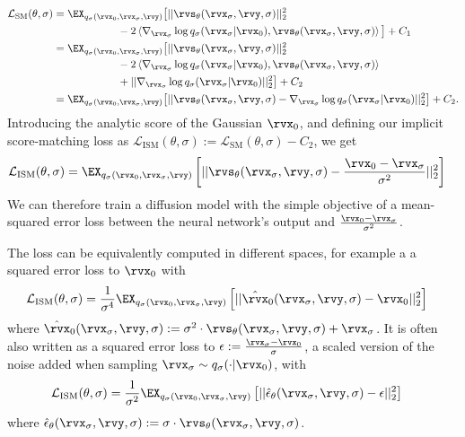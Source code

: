 \begin{align}
    \mathcal{L}_\text{SM}(\theta, \sigma) &= \EX_{q_{\sigma}(\rvx_0, \rvx_\sigma, \rvy)} \big[ 
    || \rvs_\theta(\rvx_\sigma, \rvy, \sigma) ||_2^2
    \nonumber\\ &\qquad\qquad\qquad
    - 2 \left\langle \nabla_{\rvx_\sigma} \log q_{\sigma}(\rvx_\sigma|\rvx_0), \rvs_\theta(\rvx_\sigma, \rvy, \sigma) \right\rangle \big] + C_1 \\
    &= \EX_{q_{\sigma}(\rvx_0, \rvx_\sigma, \rvy)} \big[ 
    || \rvs_\theta(\rvx_\sigma, \rvy, \sigma) ||_2^2
    \nonumber\\ &\qquad\qquad\qquad
    - 2 \left\langle \nabla_{\rvx_\sigma} \log q_{\sigma}(\rvx_\sigma|\rvx_0), \rvs_\theta(\rvx_\sigma, \rvy, \sigma) \right\rangle
    \nonumber\\ &\qquad\qquad\qquad
    + || \nabla_{\rvx_\sigma} \log q_{\sigma}(\rvx_\sigma|\rvx_0) ||_2^2 \big] + C_2 \\
    &= \EX_{q_{\sigma}(\rvx_0, \rvx_\sigma, \rvy)} \big[ 
    || \rvs_\theta(\rvx_\sigma, \rvy, \sigma) - \nabla_{\rvx_\sigma} \log q_{\sigma}(\rvx_\sigma|\rvx_0) ||_2^2 \big] + C_2.
\end{align}
Introducing the analytic score of the Gaussian $\rvx_0$, and defining our implicit score-matching loss as $\mathcal{L}_\text{ISM}(\theta, \sigma) := \mathcal{L}_\text{SM}(\theta, \sigma) - C_2$, we get
\begin{align}
    \mathcal{L}_\text{ISM}(\theta, \sigma) &= \EX_{q_{\sigma}(\rvx_0, \rvx_\sigma, \rvy)} \left[ 
    || \rvs_\theta(\rvx_\sigma, \rvy, \sigma) - \frac{\rvx_0-\rvx_\sigma}{\sigma^2} ||_2^2 \right]
\end{align}
We can therefore train a diffusion model with the simple objective of a mean-squared error loss between the neural network's output and $\frac{\rvx_0-\rvx_\sigma}{\sigma^2}$.

The loss can be equivalently computed in different spaces, for example a a squared error loss to $\rvx_0$ with
\begin{align}
    \mathcal{L}_\text{ISM}(\theta, \sigma) &= \frac{1}{\sigma^4} \EX_{q_{\sigma}(\rvx_0, \rvx_\sigma, \rvy)} \left[ 
    || \hat{\rvx}_0(\rvx_\sigma, \rvy, \sigma) - \rvx_0 ||_2^2 \right]
\end{align}
where $\hat{\rvx}_0(\rvx_\sigma, \rvy, \sigma) := \sigma^2 \cdot \rvs_\theta(\rvx_\sigma, \rvy, \sigma) + \rvx_\sigma$. 
It is often also written as a squared error loss to $\epsilon := \frac{\rvx_\sigma - \rvx_0}{\sigma}$, a scaled version of the noise added when sampling $\rvx_\sigma \sim q_\sigma(\cdot|\rvx_0)$, with
\begin{align}
    \mathcal{L}_\text{ISM}(\theta, \sigma) &= \frac{1}{\sigma^2} \EX_{q_{\sigma}(\rvx_0, \rvx_\sigma, \rvy)} \left[ 
    || \hat{\mathbf{\epsilon}}_\theta(\rvx_\sigma, \rvy, \sigma) - \epsilon ||_2^2 \right]
\end{align}
where $\hat{\mathbf{\epsilon}}_\theta(\rvx_\sigma, \rvy, \sigma) := \sigma \cdot \rvs_\theta(\rvx_\sigma, \rvy, \sigma)$.

